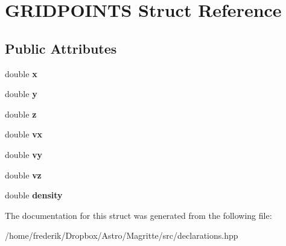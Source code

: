 \hypertarget{structGRIDPOINTS}{}\section{G\+R\+I\+D\+P\+O\+I\+N\+TS Struct Reference}
\label{structGRIDPOINTS}
\subsection*{Public Attributes}
\begin{DoxyCompactItemize}
\item 
\mbox{\label{structGRIDPOINTS_ab005c20b4eba17ad175e7249f100e3f3}} 
double {\bfseries x}
\item 
\mbox{\label{structGRIDPOINTS_ae84ca528c2164162fd2578b7adc13ee1}} 
double {\bfseries y}
\item 
\mbox{\label{structGRIDPOINTS_adee58697816208b8133b396a5dbec0cf}} 
double {\bfseries z}
\item 
\mbox{\label{structGRIDPOINTS_a9a394b27d37551671aa45017aa3cfe16}} 
double {\bfseries vx}
\item 
\mbox{\label{structGRIDPOINTS_aa5a77adddddbfcb246b6ed19f632de1f}} 
double {\bfseries vy}
\item 
\mbox{\label{structGRIDPOINTS_a56cc85d1c044bf545e305ef16746c86e}} 
double {\bfseries vz}
\item 
\mbox{\label{structGRIDPOINTS_aaf9d93b969570fc5181ba79234b3042d}} 
double {\bfseries density}
\end{DoxyCompactItemize}


The documentation for this struct was generated from the following file\+:\begin{DoxyCompactItemize}
\item 
/home/frederik/\+Dropbox/\+Astro/\+Magritte/src/declarations.\+hpp\end{DoxyCompactItemize}
